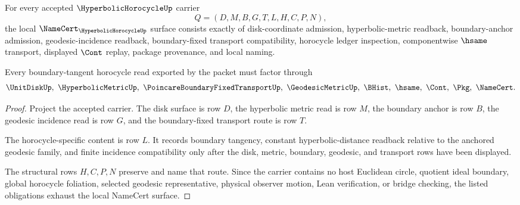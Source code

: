 \begin{theorem}
\label{thm:hyperbolic-horocycle-namecert-obligations}
For every accepted $\HyperbolicHorocycleUp$ carrier
$$
Q=(D,M,B,G,T,L,H,C,P,N),
$$
the local $\NameCert_{\HyperbolicHorocycleUp}$ surface consists exactly of disk-coordinate admission, hyperbolic-metric readback, boundary-anchor admission, geodesic-incidence readback, boundary-fixed transport compatibility, horocycle ledger inspection, componentwise $\hsame$ transport, displayed $\Cont$ replay, package provenance, and local naming.

Every boundary-tangent horocycle read exported by the packet must factor through
$$
\UnitDiskUp,\ \HyperbolicMetricUp,\ \PoincareBoundaryFixedTransportUp,\ \GeodesicMetricUp,\ \BHist,\ \hsame,\ \Cont,\ \Pkg,\ \NameCert .
$$
\end{theorem}
\begin{proof}
Project the accepted carrier. The disk surface is row $D$, the hyperbolic metric read is row $M$, the boundary anchor is row $B$, the geodesic incidence read is row $G$, and the boundary-fixed transport route is row $T$.

The horocycle-specific content is row $L$. It records boundary tangency, constant hyperbolic-distance readback relative to the anchored geodesic family, and finite incidence compatibility only after the disk, metric, boundary, geodesic, and transport rows have been displayed.

The structural rows $H,C,P,N$ preserve and name that route. Since the carrier contains no host Euclidean circle, quotient ideal boundary, global horocycle foliation, selected geodesic representative, physical observer motion, Lean verification, or bridge checking, the listed obligations exhaust the local NameCert surface.
\end{proof}



